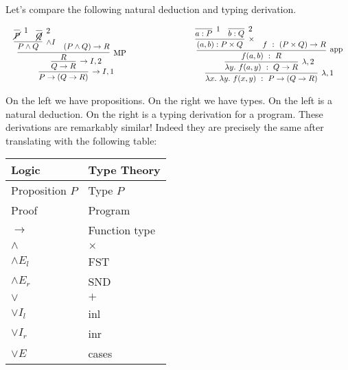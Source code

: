 \documentclass{book}
\begin{document}
    Let's compare the following natural deduction and typing derivation. 
    \begin{center}
        $\begin{array}{c c c}
            
            \begin{array}{c}
                \infer[\to I,1]{P \to (Q \to R)}
                    {\infer[\to I,2]{Q \to R}
                        {\infer[\MP]{R}
                            {\infer[\land I]{P \land Q}
                                {\infer[1]{\cancel{P}}{} & \infer[2]{\cancel{Q}}{}}
                            &							
                            (P \land Q) \to R}}}
            \end{array}

            &

            \hspace{2cm}
           
            &

            \begin{array}{c}
                \infer[\lambda,1]{\lambda x. \ \lambda y. \ f(x,y) \ : \ P\to(Q\to R)}
                    {\infer[\lambda,2]{\lambda y. \ f(a,y) \ : \ Q\to R}
                        {\infer[\app]{f(a,b) \ : \ R}
                            {\infer[\times]{(a,b) : P\times Q}
                                {\infer[1]{a:P}{}
                                &
                                \infer[2]{b:Q}{}}
                            &
                            f \ : \ (P\times Q) \to R}}}
            \end{array} 
        \end{array}$
    \end{center}

    On the left we have propositions. On the right we have types. On the left is a natural deduction. On the right is a typing derivation for a program. These derivations are remarkably similar! Indeed they are precisely the same after translating with the following table: 

    \begin{center}
        \begin{tabular}{l|l}
          Logic & Type Theory \\
          \hline
          Proposition $P$ & Type $P$ \\
          Proof & Program \\
          $\to$ & Function type \\
          $\land$ & $\times$ \\
          $\land E_{l}$ & FST \\
          $\land E_{r}$ & SND \\
          $\lor$ & $+$\\ 
          $\lor I_{l}$ & inl \\
          $\lor I_{r}$ & inr \\
          $\lor E$ & cases  
        \end{tabular}
      \end{center}
\end{document}
